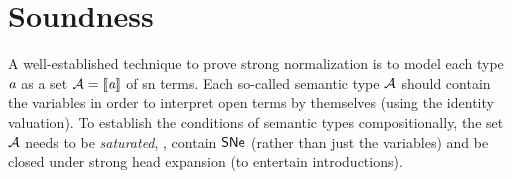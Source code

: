 \section{Soundness}
\label{sec:soundess}

A well-established technique 
\citep{tait:functionalsFiniteTypeI} to prove strong normalization is to model
each type $\va$ as a set $\A = \den{\va}$ of sn terms.  Each so-called
semantic type $\mathcal{A}$
should contain the variables in order to interpret open terms by
themselves (using the identity valuation).
To establish the conditions of semantic types compositionally, 
the set $\mathcal{A}$ needs to be \emph{saturated},
\ie, contain $\SNe$ (rather than just the variables) and be closed
under strong head expansion (to entertain introductions).





